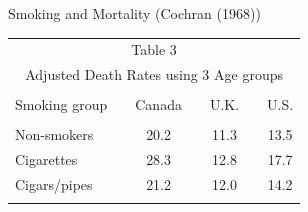\documentclass[xcolor=dvipsnames]{beamer}
\begin{document}
\begin{frame}{Smoking and Mortality (Cochran (1968))}

\begin{center}
 \begin{tabular}{lcccccc}
 \multicolumn{7}{c}{\small\sc Table 3}\\
 \multicolumn{7}{c}{\footnotesize\sc Adjusted Death Rates using 3 Age groups}
 \vspace*{0.1cm}\\\hline\hline\\
 Smoking group&&Canada&&U.K.&&U.S.\\\hline\\
 Non-smokers&&20.2&&11.3&&13.5\\
 Cigarettes&&28.3&&12.8&&17.7\\
 Cigars/pipes&&21.2&&12.0&&14.2\\\hline\\
 \end{tabular}
\end{center}
\end{frame}
\end{document}
